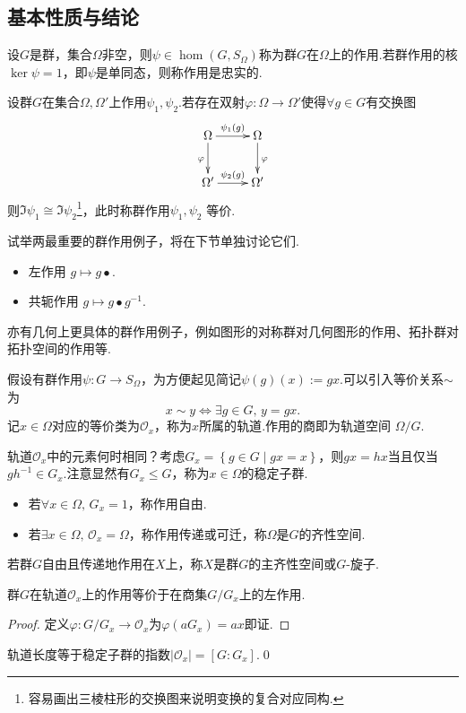 \subsection{基本性质与结论}
\begin{definition}
	设$G$是群，集合$\Omega$非空，则$\psi\in\hom(G,S_\Omega)$称为{\heiti 群$G$在$\Omega$上的作用}.若群作用的核$\ker\psi=1$，即$\psi$是单同态，则称作用是{\heiti 忠实的}.

	设群$G$在集合$\Omega,\Omega'$上作用$\psi_1,\psi_2$.若存在双射$\varphi\colon\Omega\to\Omega'$使得$\forall g\in G$有交换图
	\[
		\xymatrix{
			\Omega\ar[r]^{\psi_1(g)}\ar[d]_\varphi&\Omega\ar[d]^\varphi\\
			\Omega'\ar[r]^{\psi_2(g)}&\Omega'
		}
	\]
	则$\Im\psi_1\cong\Im\psi_2$\footnote{容易画出三棱柱形的交换图来说明变换的复合对应同构.}，此时称群作用$\psi_1,\psi_2$ {\heiti 等价}.
\end{definition}


试举两最重要的群作用例子，将在下节单独讨论它们.
\begin{itemize}
	\item {\heiti 左作用} $g\mapsto g\bullet$.
	\item {\heiti 共轭作用} $g\mapsto g\bullet g^{-1}$.
\end{itemize}

亦有几何上更具体的群作用例子，例如图形的对称群对几何图形的作用、拓扑群对拓扑空间的作用等.

假设有群作用$\psi\colon G\to S_\Omega$，为方便起见简记$\psi(g)(x):=gx$.可以引入等价关系$\sim$为
\[
	x\sim y\iff\exists g\in G,\,y=gx.
\]
记$x\in\Omega$对应的等价类为$\mathcal{O}_x$，称为$x$所属的{\heiti 轨道}.作用的{\heiti 商}即为{\heiti 轨道空间} $\Omega/G$.

轨道$\mathcal{O}_x$中的元素何时相同？考虑$G_x=\left\{g\in G\mid gx=x\right\}$，则$gx=hx$当且仅当$gh^{-1}\in G_x$.注意显然有$G_x\le G$，称为$x\in\Omega$的{\heiti 稳定子群}.

\begin{itemize}
	\item 若$\forall x\in\Omega,\,G_x=1$，称作用{\heiti 自由}.
	\item 若$\exists x\in\Omega,\,\mathcal{O}_x=\Omega$，称作用{\heiti 传递}或{\heiti 可迁}，称$\Omega$是$G$的{\heiti 齐性空间}.
\end{itemize}
\begin{remark}
	若群$G$自由且传递地作用在$X$上，称$X$是群$G$的{\heiti 主齐性空间}或$G${\heiti -旋子}.
\end{remark}
\begin{prop}
	群$G$在轨道$\mathcal{O}_x$上的作用等价于在商集\footnotemark $G/G_x$上的左作用.\hypertarget{prop:GrpActionEquiv}{}
\end{prop}
\begin{proof}
	定义$\varphi\colon G/G_x\to \mathcal{O}_x$为$\varphi(aG_x)=ax$即证.
\end{proof}
\begin{cor*}
	轨道长度等于稳定子群的指数$|\mathcal{O}_x|=[G:G_x]$.\qed
\end{cor*}

